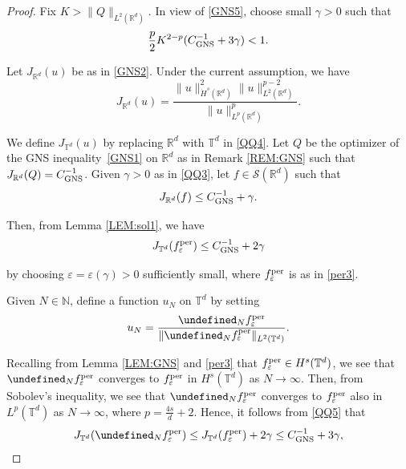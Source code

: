 \documentclass[letterpaper, 11pt,  reqno]{amsart}
\newcommand{\noi}{\noindent}
\newcommand{\R}{\mathbb{R}}
\newcommand{\T}{\mathbb{T}}
\let\P= \undefined
\newcommand{\P}{\mathbf{P}}
\newcommand{\eps}{\varepsilon}
\newcommand{\g}{\gamma}
\renewcommand{\S}{\mathcal{S}}
\newcommand{\N}{\mathbb{N}}
\numberwithin{equation}{section}
\numberwithin{theorem}{section}
\newcommand{\GNS}{\textup{GNS}}
\newcommand{\per}{\textup{per}}
\begin{document}
\begin{proof}
Fix $K > \|Q\|_{L^2(\R^d)}$.
In view of 
\eqref{GNS5}, choose small $\g > 0$
such that 
\begin{align}
\frac p 2 K^{2 - p} (C_{\GNS}^{-1} + 3\g) < 1.
\label{QQ3}
\end{align}


Let $J_{\R^d}(u)$ be as in  \eqref{GNS2}.
Under the current assumption, we have
\begin{equation}
J_{\R^d} (u) = 
\frac{\| u \|^{2}_{\dot{H}^s (\mathbb{R}^d)} \| u \|_{L^2 (\mathbb{R}^d)}^{p - 2}}{\| u \|^{p}_{L^p (\mathbb{R}^d)}}.
\label{QQ4}
\end{equation}


\noi
We define $J_{\T^d}(u)$
by replacing $\R^d$ with $\T^d$ in \eqref{QQ4}.
Let  $Q$ be 
the optimizer of the GNS inequality~\eqref{GNS1} on $\R^d$
as in Remark \ref{REM:GNS}
such that 
$J_{\R^d} (Q) = C_\GNS^{-1}$.
Given $\g > 0$ as in \eqref{QQ3}, 
let $f \in \S(\R^d)$ such that 
\begin{align*}
J_{\R^d}(f) \le   C_\GNS^{-1} + \g.
\end{align*}



\noi
Then, from Lemma \ref{LEM:sol1}, 
we have 
\begin{align}
J_{\T^d}(f_{\eps}^\per)\le  C^{-1}_{\GNS}+2\gamma
\label{QQ5}
\end{align}

\noi
by choosing $\eps = \eps(\g)> 0$ sufficiently small, 
where  $f_{\eps}^\per$ is as in \eqref{per3}.

Given $N \in \N$, 
define a function $u_N$ on $\T^d$ by setting
\begin{align}
u_N=\frac{\P_{N}f_{\eps}^\per}{\|\P_{N}f_{\eps}^\per\|_{L^{2}(\T^d)}}.
\label{QQ6}
\end{align}


\noi
Recalling from Lemma \ref{LEM:GNS} and \eqref{per3}
that  $f_\eps^\per \in H^s(\T^d)$, 
we see that $\P_{N}f_{\eps}^\per$ converges to $f_{\eps}^\per$
in $H^s(\T^d)$ as 
$N \to \infty$.
Then, from Sobolev's inequality, 
we see that 
$\P_{N}f_{\eps}^\per$ converges to $f_{\eps}^\per$
also in $L^p(\T^d)$ as 
$N \to \infty$, 
where
$p=\frac{4s}{d}+2$.
Hence, it follows from \eqref{QQ5}
that 
\begin{align}
J_{\T^d}(\P_{N}f_{\eps}^\per)
\le 
J_{\T^d}(f_{\eps}^\per) + 2\g \le  C^{-1}_{\GNS}+3\g, 
\label{QQ7}
\end{align}


\end{proof}
\end{document}
